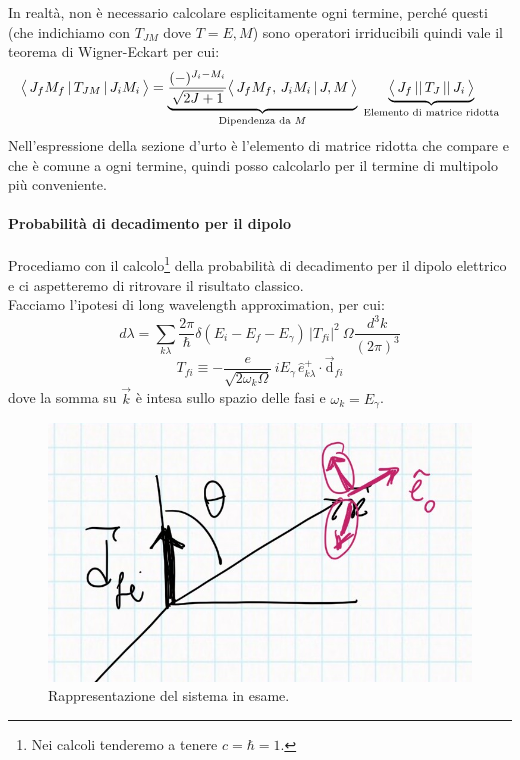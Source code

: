 In realtà, non è necessario calcolare esplicitamente ogni termine, perché questi (che indichiamo con $T_{JM}$ dove $T=E,M$) sono operatori irriducibili quindi vale il teorema di Wigner-Eckart per cui:
$$\bigl\langle\, J_fM_f\, |\,T_{JM}\, |\,J_iM_i\, \bigr\rangle = \underbrace{\frac{(-)^{J_i-M_i}}{\sqrt{2J+1}}\bigl\langle\, J_fM_f,\,J_iM_i\, |\, J,M\, \bigr\rangle}_{\text{Dipendenza da }M}\; \underbrace{\bigl\langle\, J_f\, ||\,T_J\, ||\,J_i\, \bigr\rangle}_\text{Elemento di matrice ridotta}$$
Nell'espressione della sezione d'urto è l'elemento di matrice ridotta che compare e che è comune a ogni termine, quindi posso calcolarlo per il termine di multipolo più conveniente.

\paragraph{Probabilità di decadimento per il dipolo} Procediamo con il calcolo\footnote{Nei calcoli tenderemo a tenere $c=\hbar=1$.} della probabilità di decadimento per il dipolo elettrico e ci aspetteremo di ritrovare il risultato classico.\\
Facciamo l'ipotesi di long wavelength approximation, per cui:
$$d\lambda = \sum_{k\lambda} \frac{2\pi}{\hbar} \delta(E_i-E_f-E_\gamma) \,|T_{fi}|^2 \:\Omega \frac{d^3k}{(2\pi)^3}$$
$$T_{fi}\equiv -\frac{e}{\sqrt{2\omega_k \Omega}}\,i E_\gamma \, \hat{e}^+_{k\lambda}\cdot \vec{\mathrm{d}}_{fi}$$
dove la somma su $\vec{k}$ è intesa sullo spazio delle fasi e  $\omega_k = E_\gamma$.
\begin{figure}[h]
    \centering
    \includegraphics[scale=0.2]{Immagini/0310_sistema.png}
    \caption{Rappresentazione del sistema in esame.}
    \label{0310_sist}
\end{figure}
